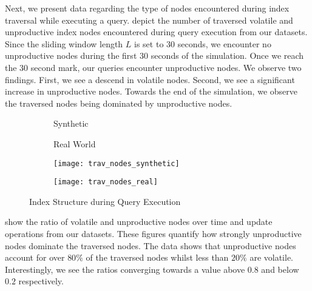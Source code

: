 \documentclass[abstracton,12pt]{scrartcl}
\theoremstyle{definition}
\begin{document}
Next, we present data regarding the type of nodes encountered during index traversal while
executing a query.
 depict
the number of traversed volatile and unproductive index nodes encountered during query
execution from our datasets.
Since the sliding window length $L$ is set to $30$ seconds, we encounter no
unproductive nodes during the first $30$ seconds of the simulation. Once we
reach the $30$ second mark, our queries encounter unproductive nodes. We observe
two findings. First, we see a descend in volatile nodes. Second, we see a
significant increase in unproductive nodes. Towards the end of the simulation,
we observe the traversed nodes being dominated by unproductive nodes. 

\begin{figure}[h]
  \centering
  \begin{subfigure}{0.49\linewidth}
    \centering
    Synthetic
  \end{subfigure}
  \begin{subfigure}{0.49\linewidth}
    \centering
    Real World
  \end{subfigure}
  \begin{subfigure}{0.49\linewidth}
    \centering
    \texttt{[image: trav\_nodes\_synthetic]}
    \caption{}
    \label{fig:trav_nodes_synthetic}
  \end{subfigure}
  \begin{subfigure}{0.49\linewidth}
    \centering
    \texttt{[image: trav\_nodes\_real]}
    \caption{}
    \label{fig:trav_nodes_real}
  \end{subfigure}
  \caption{Index Structure during Query Execution}
\end{figure}

show the ratio of volatile and unproductive nodes over time and update
operations from our datasets. These figures quantify how strongly unproductive
nodes dominate the traversed nodes. The data shows that unproductive nodes
account for over $80\%$ of the traversed nodes whilst less than $20\%$ are volatile. 
Interestingly, we see the ratios converging towards a value above
$0.8$ and below $0.2$ respectively.
\end{document}
